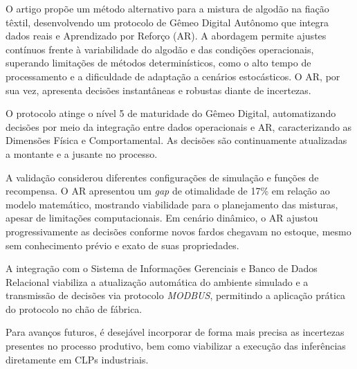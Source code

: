 \documentclass[a4paper,12pt]{article}
\begin{document}
O artigo propõe um método alternativo para a mistura de algodão na fiação têxtil, desenvolvendo um protocolo de Gêmeo Digital Autônomo que integra dados reais e Aprendizado por Reforço (AR). A abordagem permite ajustes contínuos frente à variabilidade do algodão e das condições operacionais, superando limitações de métodos determinísticos, como o alto tempo de processamento e a dificuldade de adaptação a cenários estocásticos. O AR, por sua vez, apresenta decisões instantâneas e robustas diante de incertezas.

O protocolo atinge o nível 5 de maturidade do Gêmeo Digital, automatizando decisões por meio da integração entre dados operacionais e AR, caracterizando as Dimensões Física e Comportamental. As decisões são continuamente atualizadas a montante e a jusante no processo.

A validação considerou diferentes configurações de simulação e funções de recompensa. O AR apresentou um \textit{gap} de otimalidade de 17\% em relação ao modelo matemático, mostrando viabilidade para o planejamento das misturas, apesar de limitações computacionais. Em cenário dinâmico, o AR ajustou progressivamente as decisões conforme novos fardos chegavam no estoque, mesmo sem conhecimento prévio e exato de suas propriedades.

A integração com o Sistema de Informações Gerenciais e Banco de Dados Relacional viabiliza a atualização automática do ambiente simulado e a transmissão de decisões via protocolo \textit{MODBUS}, permitindo a aplicação prática do protocolo no chão de fábrica.

Para avanços futuros, é desejável incorporar de forma mais precisa as incertezas presentes no processo produtivo, bem como viabilizar a execução das inferências diretamente em CLPs industriais.


      
\end{document}
